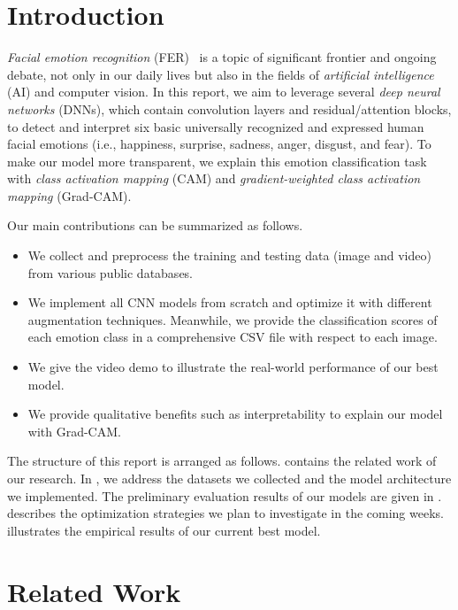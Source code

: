 \section{Introduction}
\label{sec:intro}

\textit{Facial emotion recognition} (FER)~\cite{Ko18,JainSS19} is a topic of significant frontier and ongoing debate, 
not only in our daily lives but also in the fields of \textit{artificial intelligence} (AI) and computer vision.
In this report, we aim to leverage several \textit{deep neural networks} (DNNs), 
which contain convolution layers and residual/attention blocks, 
to detect and interpret six basic universally recognized and expressed human facial emotions 
(i.e., happiness, surprise, sadness, anger, disgust, and fear). 
To make our model more transparent, 
we explain this emotion classification task with \textit{class activation mapping} (CAM) 
and \textit{gradient-weighted class activation mapping} (Grad-CAM). 

Our main contributions can be summarized as follows. %
\begin{itemize}
  \item We collect and preprocess the training and testing data (image and video) from various public databases. 
  \item We implement all CNN models from scratch and optimize it with different augmentation techniques. 
  Meanwhile, we provide the classification scores of each emotion class in a comprehensive CSV file with respect to each image. 
  \item We give the video demo to illustrate the real-world performance of our best model.
  \item We provide qualitative benefits such as interpretability to explain our model with Grad-CAM. 
\end{itemize}

The structure of this report is arranged as follows. 
 contains the related work of our research. 
In , 
we address the datasets we collected and the model architecture we implemented. 
The preliminary evaluation results of our models are given in . 
 describes the optimization strategies we plan to investigate in the coming weeks. 
 illustrates the empirical results of our current best model. 


\section{Related Work}
\label{sec:related}

